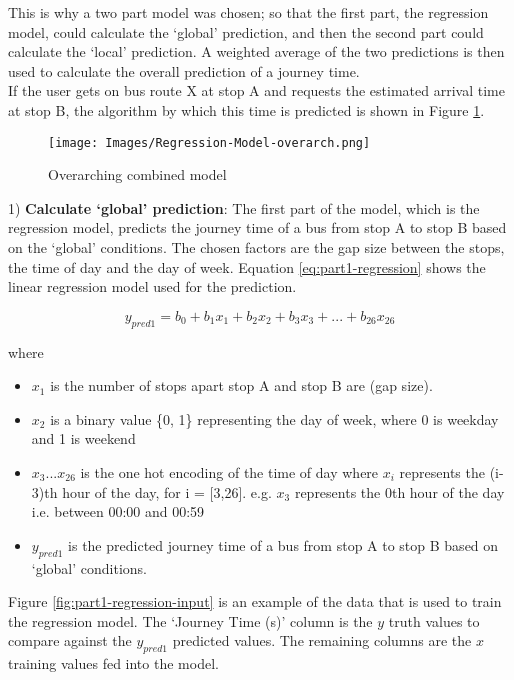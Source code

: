 This is why a two part model was chosen; so that the first part, the regression model, could calculate the `global' prediction, and then the second part could calculate the `local' prediction. A weighted average of the two predictions is then used to calculate the overall prediction of a journey time. \\

If the user gets on bus route X at stop A and requests the estimated arrival time at stop B, the algorithm by which this time is predicted is shown in Figure \ref{fig:overarch-combined-model}. \\

\begin{figure}[H]
\begin{center}
    \texttt{[image: Images/Regression-Model-overarch.png]}
    \caption{Overarching combined model}
    \label{fig:overarch-combined-model}
\end{center}
\end{figure}

1) \textbf{Calculate `global' prediction}: The first part of the model, which is the regression model, predicts the journey time of a bus from stop A to stop B based on the `global' conditions. The chosen factors are the gap size between the stops, the time of day and the day of week. Equation \ref{eq:part1-regression} shows the linear regression model used for the prediction.

\begin{equation}
\label{eq:part1-regression}
    y_{pred1} = b_0 + b_1x_1 + b_2x_2 + b_3x_3 + ... + b_{26}x_{26}
\end{equation}

where 
\begin{itemize}
    \item $x_1$ is the number of stops apart stop A and stop B are (gap size).
    \item $x_2$ is a binary value \{0, 1\} representing the day of week, where 0 is weekday and 1 is weekend
    \item $x_3 ... x_{26}$ is the one hot encoding of the time of day where $x_i$ represents the (i-3)th hour of the day, for i = [3,26]. e.g. $x_3$ represents the 0th hour of the day i.e. between 00:00 and 00:59
    \item $y_{pred1}$ is the predicted journey time of a bus from stop A to stop B based on `global' conditions.
\end{itemize}

Figure \ref{fig:part1-regression-input} is an example of the data that is used to train the regression model. The `Journey Time (s)' column is the $y$ truth values to compare against the $y_{pred1}$ predicted values. The remaining columns are the $x$ training values fed into the model.

